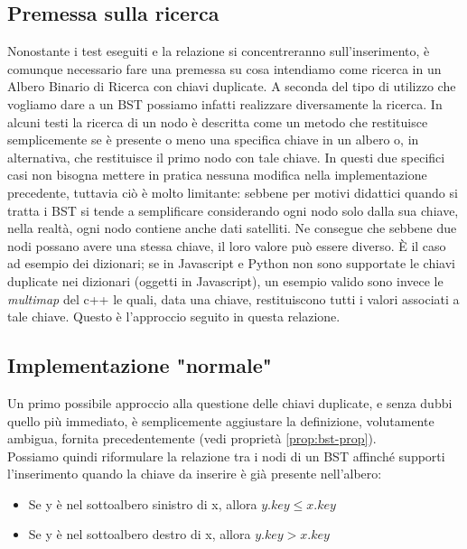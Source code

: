 \documentclass{article}
\begin{document}
\subsection{Premessa sulla ricerca}\label{subsec:search-int}Nonostante i test eseguiti e la relazione si concentreranno  sull'inserimento, è comunque necessario fare una premessa su cosa intendiamo come ricerca in un Albero Binario di Ricerca con chiavi duplicate. A seconda del tipo di utilizzo che vogliamo dare a un BST possiamo infatti realizzare diversamente la ricerca. In alcuni testi la ricerca di un nodo è descritta come un metodo che restituisce semplicemente se è presente o meno una specifica chiave in un albero o, in alternativa, che restituisce il primo nodo con tale chiave. In questi due specifici casi non bisogna mettere in pratica nessuna modifica nella implementazione precedente, tuttavia ciò è molto limitante: sebbene per motivi didattici quando si tratta i BST si tende a semplificare considerando ogni nodo solo dalla sua chiave, nella realtà, ogni nodo contiene anche dati satelliti. Ne consegue che sebbene due nodi possano avere una stessa chiave, il loro valore può essere diverso.
È il caso ad esempio dei dizionari; se in Javascript e Python non sono supportate le chiavi duplicate nei dizionari (oggetti in Javascript), un esempio valido sono invece le \textit{multimap} del c++ le quali, data una chiave, restituiscono tutti i valori associati a tale chiave. Questo è l'approccio seguito in questa relazione. 
 

 
\subsection{Implementazione "normale"}\label{subsec:normal-implementation}
Un primo possibile approccio alla questione delle chiavi duplicate, e senza dubbi quello più immediato, è semplicemente aggiustare la definizione, volutamente ambigua, fornita precedentemente (vedi proprietà \ref{prop:bst-prop}).\\
Possiamo quindi riformulare la relazione tra i nodi di un BST affinché supporti l'inserimento quando la chiave da inserire è già presente nell'albero:

\begin{center}
\begin{mybox}
	\begin{itemize}
    \item Se y è nel sottoalbero sinistro di x, allora \(y.key \le x.key\) 
     \item Se y è nel sottoalbero destro di x, allora \(y.key > x.key\) 
	\end{itemize}
\end{mybox}
\end{center}
\label{prop:bst-normal-implementation-prop}
\end{document}
